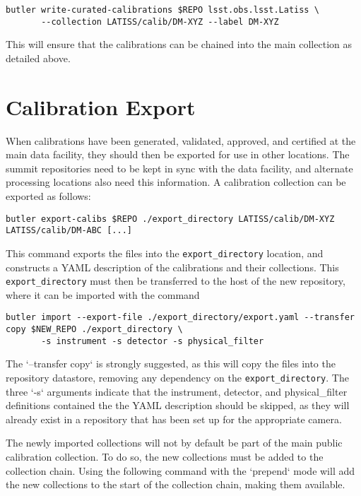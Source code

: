 \documentclass[DM,authoryear,toc]{lsstdoc}
\begin{document}
\begin{verbatim}
butler write-curated-calibrations $REPO lsst.obs.lsst.Latiss \
       --collection LATISS/calib/DM-XYZ --label DM-XYZ
\end{verbatim}

This will ensure that the calibrations can be chained into the main collection as detailed above.

\section{Calibration Export}

When calibrations have been generated, validated, approved, and certified at the main data facility, they should then be exported for use in other locations.  The summit repositories need to be kept in sync with the data facility, and alternate processing locations also need this information.  A calibration collection can be exported as follows:

\begin{verbatim}
butler export-calibs $REPO ./export_directory LATISS/calib/DM-XYZ LATISS/calib/DM-ABC [...]
\end{verbatim}

This command exports the files into the \verb|export_directory| location, and constructs a YAML description of the calibrations and their collections.  This \verb|export_directory| must then be transferred to the host of the new repository, where it can be imported with the command

\begin{verbatim}
butler import --export-file ./export_directory/export.yaml --transfer copy $NEW_REPO ./export_directory \
       -s instrument -s detector -s physical_filter
\end{verbatim}

The `--transfer copy` is strongly suggested, as this will copy the files into the repository datastore, removing any dependency on the \verb|export_directory|.  The three `-s` arguments indicate that the instrument, detector, and physical\_filter definitions contained the the YAML description should be skipped, as they will already exist in a repository that has been set up for the appropriate camera.

The newly imported collections will not by default be part of the main public calibration collection.  To do so, the new collections must be added to the collection chain.  Using the following command with the `prepend` mode will add the new collections to the start of the collection chain, making them available.
\end{document}
